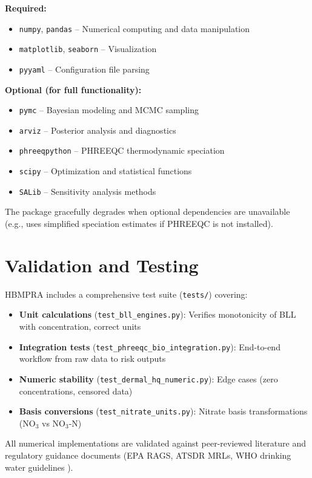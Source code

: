 \documentclass[11pt,a4paper]{article}
\begin{document}
\textbf{Required:}
\begin{itemize}
    \item \texttt{numpy}, \texttt{pandas} -- Numerical computing and data manipulation
    \item \texttt{matplotlib}, \texttt{seaborn} -- Visualization
    \item \texttt{pyyaml} -- Configuration file parsing
\end{itemize}

\textbf{Optional (for full functionality):}
\begin{itemize}
    \item \texttt{pymc} -- Bayesian modeling and MCMC sampling
    \item \texttt{arviz} -- Posterior analysis and diagnostics
    \item \texttt{phreeqpython} -- PHREEQC thermodynamic speciation
    \item \texttt{scipy} -- Optimization and statistical functions
    \item \texttt{SALib} \citep{Herman:2017} -- Sensitivity analysis methods
\end{itemize}

The package gracefully degrades when optional dependencies are unavailable (e.g., uses simplified speciation estimates if PHREEQC is not installed).

\section{Validation and Testing}

HBMPRA includes a comprehensive test suite (\texttt{tests/}) covering:

\begin{itemize}
    \item \textbf{Unit calculations} (\texttt{test\_bll\_engines.py}): Verifies monotonicity of BLL with concentration, correct units
    \item \textbf{Integration tests} (\texttt{test\_phreeqc\_bio\_integration.py}): End-to-end workflow from raw data to risk outputs
    \item \textbf{Numeric stability} (\texttt{test\_dermal\_hq\_numeric.py}): Edge cases (zero concentrations, censored data)
    \item \textbf{Basis conversions} (\texttt{test\_nitrate\_units.py}): Nitrate basis transformations (NO$_3$ vs NO$_3$-N)
\end{itemize}

All numerical implementations are validated against peer-reviewed literature and regulatory guidance documents (EPA RAGS, ATSDR MRLs, WHO drinking water guidelines \citep{WHO:2017}).
\end{document}
